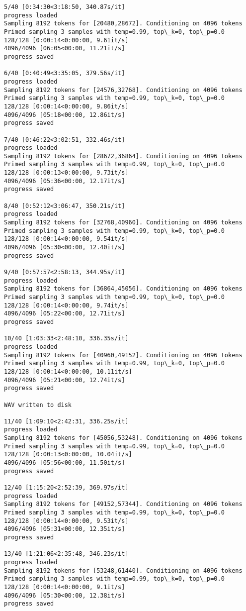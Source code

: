 \documentclass[11pt]{article}
\begin{document}
\begin{Verbatim}[commandchars=\\\{\}]
5/40 [0:34:30<3:18:50, 340.87s/it]
progress loaded
Sampling 8192 tokens for [20480,28672]. Conditioning on 4096 tokens
Primed sampling 3 samples with temp=0.99, top\_k=0, top\_p=0.0
128/128 [0:00:14<0:00:00, 9.61it/s]
4096/4096 [06:05<00:00, 11.21it/s]
progress saved

6/40 [0:40:49<3:35:05, 379.56s/it]
progress loaded
Sampling 8192 tokens for [24576,32768]. Conditioning on 4096 tokens
Primed sampling 3 samples with temp=0.99, top\_k=0, top\_p=0.0
128/128 [0:00:14<0:00:00, 9.86it/s]
4096/4096 [05:18<00:00, 12.86it/s]
progress saved

7/40 [0:46:22<3:02:51, 332.46s/it]
progress loaded
Sampling 8192 tokens for [28672,36864]. Conditioning on 4096 tokens
Primed sampling 3 samples with temp=0.99, top\_k=0, top\_p=0.0
128/128 [0:00:13<0:00:00, 9.73it/s]
4096/4096 [05:36<00:00, 12.17it/s]
progress saved

8/40 [0:52:12<3:06:47, 350.21s/it]
progress loaded
Sampling 8192 tokens for [32768,40960]. Conditioning on 4096 tokens
Primed sampling 3 samples with temp=0.99, top\_k=0, top\_p=0.0
128/128 [0:00:14<0:00:00, 9.54it/s]
4096/4096 [05:30<00:00, 12.40it/s]
progress saved

9/40 [0:57:57<2:58:13, 344.95s/it]
progress loaded
Sampling 8192 tokens for [36864,45056]. Conditioning on 4096 tokens
Primed sampling 3 samples with temp=0.99, top\_k=0, top\_p=0.0
128/128 [0:00:14<0:00:00, 9.74it/s]
4096/4096 [05:22<00:00, 12.71it/s]
progress saved

10/40 [1:03:33<2:48:10, 336.35s/it]
progress loaded
Sampling 8192 tokens for [40960,49152]. Conditioning on 4096 tokens
Primed sampling 3 samples with temp=0.99, top\_k=0, top\_p=0.0
128/128 [0:00:14<0:00:00, 10.11it/s]
4096/4096 [05:21<00:00, 12.74it/s]
progress saved

WAV written to disk

11/40 [1:09:10<2:42:31, 336.25s/it]
progress loaded
Sampling 8192 tokens for [45056,53248]. Conditioning on 4096 tokens
Primed sampling 3 samples with temp=0.99, top\_k=0, top\_p=0.0
128/128 [0:00:13<0:00:00, 10.04it/s]
4096/4096 [05:56<00:00, 11.50it/s]
progress saved

12/40 [1:15:20<2:52:39, 369.97s/it]
progress loaded
Sampling 8192 tokens for [49152,57344]. Conditioning on 4096 tokens
Primed sampling 3 samples with temp=0.99, top\_k=0, top\_p=0.0
128/128 [0:00:14<0:00:00, 9.53it/s]
4096/4096 [05:31<00:00, 12.35it/s]
progress saved

13/40 [1:21:06<2:35:48, 346.23s/it]
progress loaded
Sampling 8192 tokens for [53248,61440]. Conditioning on 4096 tokens
Primed sampling 3 samples with temp=0.99, top\_k=0, top\_p=0.0
128/128 [0:00:14<0:00:00, 9.1it/s]
4096/4096 [05:30<00:00, 12.38it/s]
progress saved


\end{Verbatim}
\end{document}
